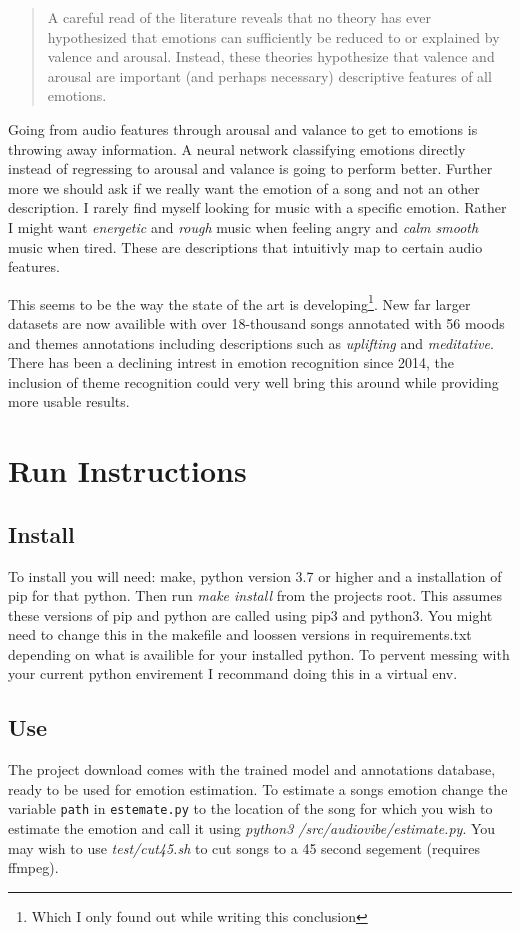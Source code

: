 \documentclass[lang=en, hanging-titles=true]{skrapport}
\begin{document}
\blockquote{
A careful read of the literature reveals that no theory has ever hypothesized that emotions can sufficiently be reduced to or explained by valence and arousal. Instead, these theories hypothesize that valence and arousal are important (and perhaps necessary) descriptive features of all emotions.
}

Going from audio features through arousal and valance to get to emotions is throwing away information. A neural network classifying emotions directly instead of regressing to arousal and valance is going to perform better. Further more we should ask if we really want the emotion of a song and not an other description. I rarely find myself looking for music with a specific emotion. Rather I might want \textit{energetic} and \textit{rough} music when feeling angry and \textit{calm smooth} music when tired. These are descriptions that intuitivly map to certain audio features.

This seems to be the way the state of the art is developing\footnote{Which I only found out while writing this conclusion}. New far larger datasets are now availible with over 18-thousand songs annotated with 56 moods and themes annotations including descriptions such as \textit{uplifting} and \textit{meditative}\cite{themes}. There has been a declining intrest in emotion recognition since 2014, the inclusion of theme recognition could very well bring this around while providing more usable results.

\clearpage
\appendix
\section{Run Instructions}
\subsection*{Install}
To install you will need: make, python version 3.7 or higher and a installation of pip for that python. Then run \textit{make install} from the projects root. This assumes these versions of pip and python are called using pip3 and python3. You might need to change this in the makefile and loossen versions in requirements.txt depending on what is availible for your installed python. To pervent messing with your current python envirement I recommand doing this in a virtual env.

\subsection*{Use}
The project download comes with the trained model and annotations database, ready to be used for emotion estimation. To estimate a songs emotion change the variable \texttt{path} in \texttt{estemate.py} to the location of the song for which you wish to estimate the emotion and call it using \textit{python3 /src/audiovibe/estimate.py}. You may wish to use \textit{test/cut45.sh} to cut songs to a 45 second segement (requires ffmpeg).

\printbibliography
\end{document}

